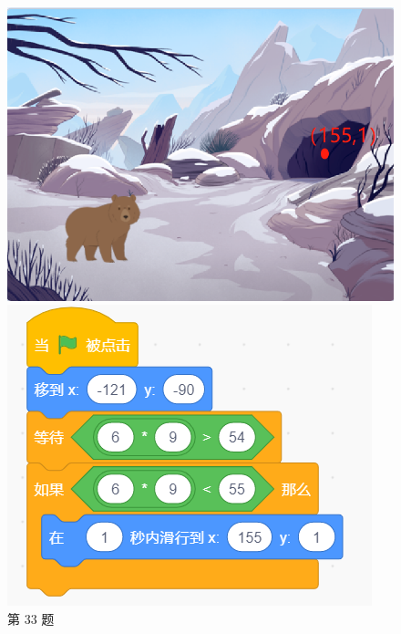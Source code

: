 \documentclass[10pt, a4paper]{article}
\begin{document}
\begin{enumerate}
\begin{figure}[htbp]
\begin{minipage}[t]{.1\textwidth}
                \caption*{第 33 题}
            \end{minipage}
            \begin{minipage}[t]{.45\textwidth}
                \centering
                \begin{minipage}[t]{.48\textwidth}
                    \centering
                    \includegraphics[width=\textwidth]{34-1.png}
                \end{minipage}
                \begin{minipage}[t]{.48\textwidth}
                    \centering
                    \includegraphics[width=\textwidth]{34-2.png}

\end{minipage}
\end{minipage}
\end{figure}
\end{enumerate}
\end{document}
